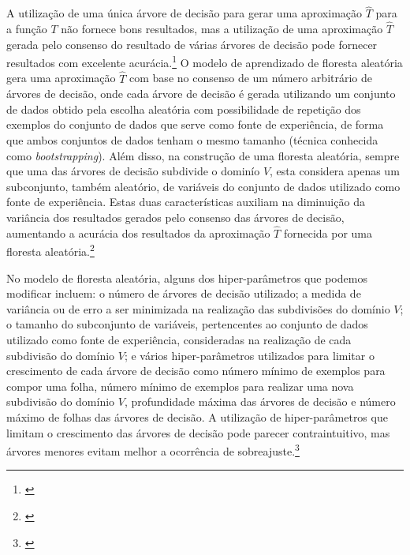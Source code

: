 A utilização de uma única árvore de decisão para gerar uma aproximação $\hat{T}$ para a função $T$ não fornece bons resultados, mas a utilização de uma aproximação $\hat{T}$ gerada pelo consenso do resultado de várias árvores de decisão pode fornecer resultados com excelente acurácia.\footnote{\cite[p.303]{statistical_learning}} O modelo de aprendizado de floresta aleatória gera uma aproximação $\hat{T}$ com base no consenso de um número arbitrário de árvores de decisão, onde cada árvore de decisão é gerada utilizando um conjunto de dados obtido pela escolha aleatória com possibilidade de repetição dos exemplos do conjunto de dados que serve como fonte de experiência, de forma que ambos conjuntos de dados tenham o mesmo tamanho (técnica conhecida como \textit{bootstrapping}). Além disso, na construção de uma floresta aleatória, sempre que uma das árvores de decisão subdivide o dominío $V$, esta considera apenas um subconjunto, também aleatório, de variáveis do conjunto de dados utilizado como fonte de experiência. Estas duas características auxiliam na diminuição da variância dos resultados gerados pelo consenso das árvores de decisão, aumentando a acurácia dos resultados da aproximação $\hat{T}$ fornecida por uma floresta aleatória.\footnote{\cite[p.316-321]{statistical_learning}}

No modelo de floresta aleatória, alguns dos hiper-parâmetros que podemos modificar incluem: o número de árvores de decisão utilizado; a medida de variância ou de erro a ser minimizada na realização das subdivisões do domínio $V$; o tamanho do subconjunto de variáveis, pertencentes ao conjunto de dados utilizado como fonte de experiência, consideradas na realização de cada subdivisão do domínio $V$; e vários hiper-parâmetros utilizados para limitar o crescimento de cada árvore de decisão como número mínimo de exemplos para compor uma folha, número mínimo de exemplos para realizar uma nova subdivisão do domínio $V$, profundidade máxima das árvores de decisão e número máximo de folhas das árvores de decisão. A utilização de hiper-parâmetros que limitam o crescimento das árvores de decisão pode parecer contraintuitivo, mas árvores menores evitam melhor a ocorrência de sobreajuste.\footnote{\cite[p.307]{statistical_learning}}

